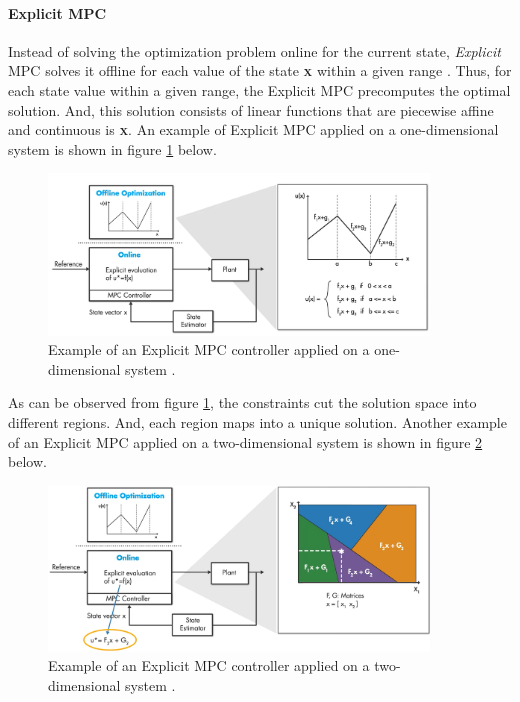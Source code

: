 \documentclass{thesisreport}
\begin{document}
\paragraph{Explicit MPC} Instead of solving the optimization problem online for the current state, \textit{Explicit} MPC solves it offline for each value of the state \textbf{\textsc{x}} within a given range \cite{Bemporad2013}. Thus, for each state value within a given range, the Explicit MPC precomputes the optimal solution. And, this solution consists of linear functions that are piecewise affine and continuous is \textbf{\textsc{x}}. An example of Explicit MPC applied on a one-dimensional system is shown in figure \ref{Explicit_MPC_1D} below.

\begin{figure}[h]
\centering
\includegraphics[width=0.9\textwidth]{Images/Control/Explicit_MPC_a}
\caption{Example of an Explicit MPC controller applied on a one-dimensional system \cite{MathWorks2018_new}.}
\label{Explicit_MPC_1D}
\end{figure}

\noindent As can be observed from figure \ref{Explicit_MPC_1D}, the constraints cut the solution space into different regions. And, each region maps into a unique solution.
Another example of an Explicit MPC applied on a two-dimensional system is shown in figure \ref{Explicit_MPC_2D} below. 

\newpage

\begin{figure}[h]
\centering
\includegraphics[width=0.9\textwidth]{Images/Control/Explicit_MPC_b}
\caption{Example of an Explicit MPC controller applied on a two-dimensional system \cite{MathWorks2018_new}.}
\label{Explicit_MPC_2D}
\end{figure}
\end{document}
